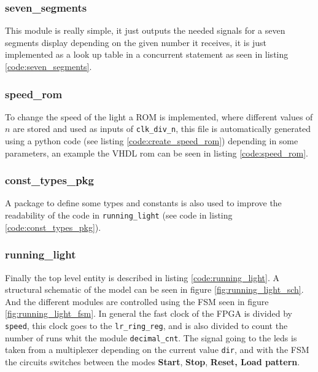 \documentclass[12pt]{article}   	%
\begin{document}
\subsubsection{seven\_segments}
This module is really simple, it just outputs the needed signals for a seven segments display depending on the given number it receives, it is just implemented as a look up table in a concurrent statement as seen in listing \ref{code:seven_segments}.


\subsubsection{speed\_rom}
To change the speed of the light a ROM is implemented, where different values of $n$ are stored and used as inputs of \lstinline{clk_div_n}, this file is automatically generated using a python code (see listing \ref{code:create_speed_rom}) depending in some parameters, an example the VHDL rom can be seen in listing \ref{code:speed_rom}.

\subsubsection{const\_types\_pkg}
A package to define some types and constants is also used to improve the readability of the code in \lstinline{running_light} (see code in listing \ref{code:const_types_pkg}).

\subsubsection{running\_light}

Finally the top level entity is described in listing \ref{code:running_light}. A structural schematic of the model can be seen in figure \ref{fig:running_light_sch}. And the different modules are controlled using the FSM seen in figure \ref{fig:running_light_fsm}. In general the fast clock of the FPGA is divided by \lstinline{speed}, this clock goes to the \lstinline{lr_ring_reg}, and is also divided to count the number of runs whit the module \lstinline{decimal_cnt}. The signal going to the leds is taken from a multiplexer depending on the current value \lstinline{dir}, and with the FSM the circuits switches between the modes \textbf{Start}, \textbf{Stop}, \textbf{Reset, Load pattern}.
\end{document}
